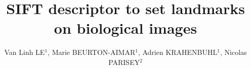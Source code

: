 \documentclass{LaBRI_poster}
\title{SIFT descriptor to set landmarks on biological images}
\author{Van Linh LE$^{1}$, Marie BEURTON-AIMAR$^{1}$, Adrien KRAHENBUHL$^{1}$, Nicolas PARISEY$^{2}$}
\institute{$^{1}$LaBRI - UMR 5800, Univ. Bordeaux; $^{2}$INRA - IGEPP UMR 1349}
\begin{document}
\begin{frame}[t] %

%

\begin{columns}[t] 

\begin{column}{\sepwidth}\end{column} %

\begin{column}{\threecolwidth}


\end{column}
\end{columns}
\end{frame}
\end{document}
